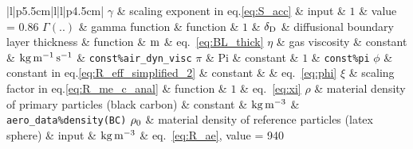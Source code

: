 \documentclass{article}
\begin{document}
\begin{longtable}{|l|p{5.5cm}|l|l|p{4.5cm}|}
$\gamma$			   & \rr scaling exponent in eq.\ref{eq:S_acc} 	 							& input			& $1$									& \rr value = 0.86									 \tn
$\Gamma(..)$		   & \rr gamma function														& function		& $1$									& \rr												 \tn
$\delta_{\rm D}$	   & \rr diffusional boundary layer thickness								& function		& $\rm m$								& \rr eq.~\ref{eq:BL_thick}							 \tn
$\eta$				   & \rr gas viscosity														& constant		& $\rm kg \, m^{-1} \, s^{-1}$			& \rr \verb+const%air_dyn_visc+						 \tn
$\pi$				   & \rr Pi																	& constant		& $1$									& \rr \verb+const%pi+			 					 \tn
$\phi$				   & \rr constant in eq.\ref{eq:R_eff_simplified_2}							& constant		& 										& \rr eq.~\ref{eq:phi}								 \tn
$\xi$				   & \rr scaling factor in eq.\ref{eq:R_me_c_anal}							& function		& $1$									& \rr eq.~\ref{eq:xi}								 \tn
$\rho$				   & \rr material density of primary particles (black carbon)				& constant		& $\rm kg \, m^{-3}$					& \rr \verb+aero_data%density(BC)+					 \tn
$\rho_{\rm 0}$		   & \rr material density of reference particles (latex sphere)				& input			& $\rm kg \, m^{-3}$					& \rr eq.~\ref{eq:R_ae}, value = 940				 \tn
\end{longtable}

\newpage
\end{document}
